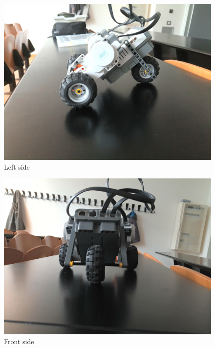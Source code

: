 \documentclass[a4paper,12pt,oneside]{article}
\begin{document}
\begin{figure}
	\centering
	\includegraphics[width=\columnwidth]{nxtImages/2.jpg}
	\caption{Left side}
	\label{fig:left}
\end{figure}
\begin{figure}
	\centering
	\includegraphics[width=\columnwidth]{nxtImages/3.jpg}
	\caption{Front side}
	\label{fig:front}
\end{figure}
\end{document}
